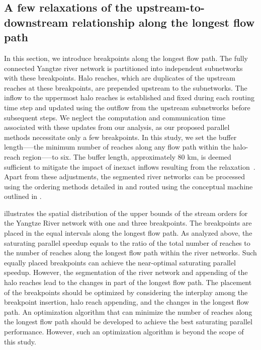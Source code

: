 \documentclass[water,article,submit,pdftex,moreauthors]{Definitions/mdpi}
\begin{document}
\subsection{A few relaxations of the upstream-to-downstream relationship along the longest flow path}
\label{sec:breakdown_yangtze}

In this section, we introduce breakpoints along the longest flow path. The fully connected Yangtze river network is partitioned into independent subnetworks with these breakpoints. Halo reaches, which are duplicates of the upstream reaches at these breakpoints, are prepended upstream to the subnetworks. The inflow to the uppermost halo reaches is established and fixed during each routing time step and updated using the outflow from the upstream subnetworks before subsequent steps. We neglect the computation and communication time associated with these updates from our analysis, as our proposed parallel methods necessitate only a few breakpoints. In this study, we set the buffer length—--the minimum number of reaches along any flow path within the halo-reach region—--to six. The buffer length, approximately 80 km, is deemed sufficient to mitigate the impact of inexact inflows resulting from the relaxation~\cite{david2013WRR}. Apart from these adjustments, the segmented river networks can be processed using the ordering methods detailed in  and routed using the conceptual machine outlined in .

 illustrates the spatial distribution of the upper bounds of the stream orders for the Yangtze River network with one and three breakpoints. The breakpoints are placed in the equal intervals along the longest flow path. As analyzed above, the saturating parallel speedup equals to the ratio of the total number of reaches to the number of reaches along the longest flow path within the river networks. Such equally placed breakpoints can achieve the near-optimal saturating parallel speedup. However, the segmentation of the river network and appending of the halo reaches lead to the changes in part of the longest flow path. The placement of the breakpoints should be optimized by considering the interplay among the breakpoint insertion, halo reach appending, and the changes in the longest flow path. An optimization algorithm that can minimize the number of reaches along the longest flow path should be developed to achieve the best saturating parallel performance. However, such an optimization algorithm is beyond the scope of this study.
\end{document}
